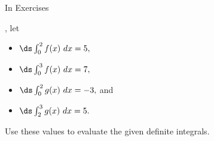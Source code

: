 \begin{exerciseset}{In Exercises}{, let
\begin{itemize}
\item $\ds \int_0^2 f(x)\ dx = 5,$
\item $\ds \int_0^3 f(x) \ dx=7,$
\item $\ds \int_0^2 g(x)\ dx = -3,$ and
\item $\ds \int_2^3 g(x)\ dx = 5.$
\end{itemize}
Use these values to evaluate the given definite integrals.}





\end{exerciseset}
